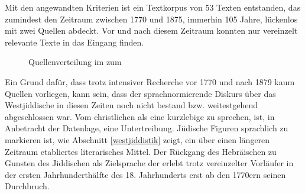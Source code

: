 Mit den angewandten Kriterien ist ein Textkorpus von 53 Texten entstanden, das zumindest den Zeitraum zwischen 1770 und 1875, immerhin 105 Jahre, lückenlos mit zwei Quellen abdeckt. Vor und nach diesem Zeitraum konnten nur vereinzelt relevante Texte in das  Eingang finden.
   
  \begin{figure}
	\caption{Quellenverteilung im  zum }\label{kgesamt}	
	\end{figure}



Ein Grund dafür, dass trotz intensiver Recherche vor 1770 und nach 1879 kaum Quellen vorliegen, kann sein, dass der sprachnormierende Diskurs über das Westjiddische in diesen Zeiten noch nicht bestand bzw. weitestgehend abgeschlossen war. Vom christlichen  als eine kurzlebige  zu sprechen, ist, in Anbetracht der Datenlage, eine Untertreibung. Jüdische Figuren sprachlich zu markieren ist, wie Abschnitt \ref{westjiddistik} zeigt, ein über einen längeren Zeitraum etabliertes literarisches Mittel. Der Rückgang des Hebräischen zu Gunsten des Jiddischen als Zielsprache der  erlebt trotz vereinzelter Vorläufer in der ersten Jahrhunderthälfte des 18. Jahrhunderts erst ab den 1770ern seinen Durchbruch.%

